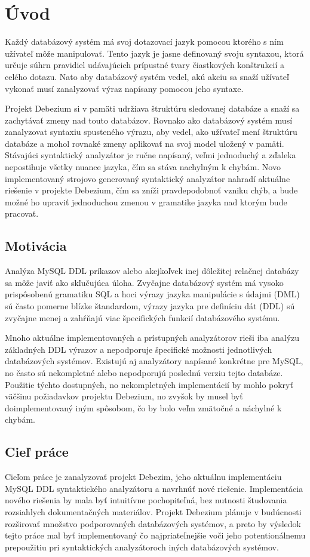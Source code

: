 \chapter{Úvod}
Každý databázový systém má svoj dotazovací jazyk pomocou ktorého s ním užívateľ môže manipulovať. Tento jazyk je jasne definovaný svoju syntaxou, ktorá určuje súhrn pravidiel udávajúcich prípustné tvary čiastkových konštrukcií a celého dotazu. Nato aby databázový systém vedel, akú akciu sa snaží užívateľ vykonať musí zanalyzovať výraz napísany pomocou jeho syntaxe.

Projekt Debezium si v pamäti udržiava štruktúru sledovanej databáze a snaží sa zachytávať zmeny nad touto databázov. Rovnako ako databázový systém musí zanalyzovat syntaxiu spusteného výrazu, aby vedel, ako užívateľ mení štruktúru databáze a mohol rovnaké zmeny aplikovať na svoj model uložený v pamäti.
Stávajúci syntaktický analyzátor je ručne napísaný, veľmi jednoduchý a zďaleka nepostihuje všetky nuance  jazyka, čím sa stáva nachylným k chybám. Novo implementovaný strojovo generovaný syntaktický analyzátor nahradí aktuálne riešenie v projekte Debezium, čím sa zníži pravdepodobnoť vzniku chýb, a bude možné ho upraviť jednoduchou zmenou v gramatike jazyka nad ktorým bude pracovať.

\section{Motivácia}
Analýza MySQL DDL príkazov alebo akejkoľvek inej dôležitej relačnej databázy sa môže javiť ako skľučujúca úloha. Zvyčajne databázový systém má vysoko prispôsobenú gramatiku SQL a hoci výrazy jazyka manipulácie s údajmi (DML) sú často pomerne blízke štandardom, výrazy jazyka pre definíciu dát (DDL) sú zvyčajne menej a zahŕňajú viac špecifických funkcií databázového systému.

Mnoho aktuálne implementovaných a prístupných analyzátorov rieši iba analýzu základných DDL výrazov a nepodporuje špecifické možnosti jednotlivých databázových systémov. Existujú aj analyzátory napísané konkrétne pre MySQL, no často sú nekompletné  alebo nepodporujú poslednú verziu tejto databáze. Použitie týchto dostupných, no nekompletných implementácií by mohlo pokryť väčšinu požiadavkov projektu Debezium, no zvyšok by musel byť doimplementovaný iným spôsobom, čo by bolo veľm zmätočné a náchylné k chybám.

\section{Cieľ práce}
Cieľom práce je zanalyzovať projekt Debezim, jeho aktuálnu implementáciu MySQL DDL syntaktického analyzátoru a navrhnúť nové riešenie. Implementácia nového riešenia by mala byť intuitívne pochopiteľná, bez nutnosti študovania rozsiahlych dokumentačných materiálov. Projekt Debezium plánuje v budúcnosti rozširovať množstvo podporovaných databázových systémov, a preto by výsledok tejto práce mal byť implementovaný čo najpriateľnejšie voči jeho potentionálnemu prepoužitiu pri syntaktických analyzátoroch iných databázových systémov.